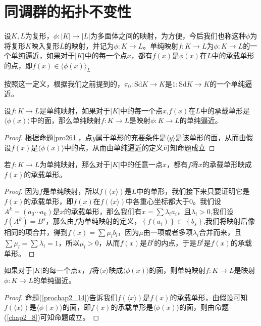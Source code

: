 \section{同调群的拓扑不变性}
\begin{definition}
设$K,L$为复形，$\phi:|K|\rightarrow |L|$为多面体之间的映射，为方便，今后我们也称这种$\phi$为将复形$K$映入复形$L$的映射，并记为$\phi:K\rightarrow L$。单纯映射$f:K\rightarrow L$为$\phi:K\rightarrow L$的一个单纯逼近，如果对于$|K|$中的每一个点$x$，都有$f(x)$是$\phi(x)$在$L$中的承载单形的点，即$f(x)\in \langle\phi(x)\rangle_{L}$
\end{definition}
按照这一定义，根据我们之前提到的，$\pi_{0}:\text{Sd}K\rightarrow K$是$1:\text{Sd}K\rightarrow K$的一个单纯逼近。
\begin{proposition}\label{chap2_8}
设$f:K\rightarrow L$是单纯映射，如果对于$|K|$中的每一个点$x$,$f(x)$在$L$中的承载单形是$\langle\phi(x)\rangle$中的面，那么单纯映射$f:K\rightarrow L$是映射$\phi:K\rightarrow L$的单纯逼近。
\end{proposition}
\begin{proof}
根据命题\ref{pro261}，点$y$属于单形的充要条件是$\langle y\rangle$是该单形的面，从而由假设$f(x)$是$\langle \phi(x)\rangle$中的点，从而由单纯逼近的定义可知命题成立
\end{proof}
\begin{proposition}\label{prochap2_14}
若$f:K\rightarrow L$为单纯映射，那么对于$|K|$中的任意一点$x$，都有$f$将$x$的承载单形映成$f(x)$的承载单形。
\end{proposition}
\begin{proof}
因为$f$是单纯映射，所以$f(\langle x\rangle)$是$L$中的单形，我们接下来只要证明它是$f(x)$的承载单形，即$f(x)$在$f(\langle x\rangle)$中各重心坐标都大于0。我们设$A^{k}=(a_{0}\cdots a_{k})$是$x$的承载单形，那么我们有$x=\sum \lambda_{i}a_{i}$，且$\lambda_{i}>0$,我们设$f(A^{k})=B^{s}$，那么由$f$为单纯映射的定义，$\left\{f(a_{i})\right\}\subset \left\{b_{s}\right\}$,我们将映射后像相同的项合并，得到$f(x)=\sum\mu_{l}b_{l}$，因为$\mu$由一项或者多项$\lambda_{i}$合并而来，且$\sum \mu_{l}=\sum\lambda_{i}=1$，所以$\mu_{l}>0$，从而$f(x)$是$B^{l}$的内点，于是$B^{l}$是$f(x)$的承载单形。
\end{proof}
\begin{corollary}\label{cor_20_chap2}
如果对于$|K|$的每一个点$x$，$f$将$\langle x\rangle$映成$\langle \phi(x)\rangle$的面，则单纯映射$f:K\rightarrow L$是映射$\phi:K\rightarrow L$的单纯逼近。
\end{corollary}
\begin{proof}
命题(\ref{prochap2_14})告诉我们$f(\langle x\rangle)$是$f(x)$的承载单形，由假设可知$f(\langle x\rangle)$是$\langle \phi(x)\rangle$的面，即$f(x)$的承载单形是$\langle \phi(x)\rangle$的面，则由命题(\ref{chap2_8})可知命题成立。
\end{proof}
